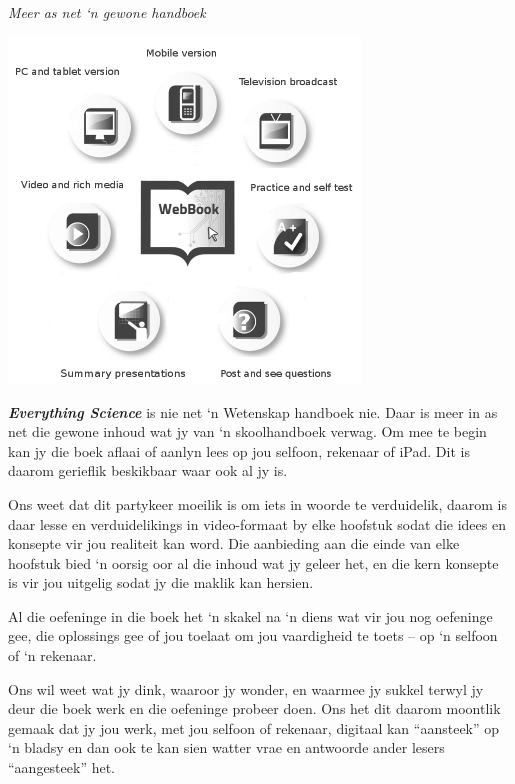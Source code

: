 
\newpage
\thispagestyle{empty}

{\normalfont\sffamily\fontsize{22}\normalfont\itshape Meer as net ‘n gewone handboek} \par

\begin{center}
\includegraphics[width=0.70\textwidth]{title_images/morethantextbook.png}
\end{center}

\par
{\Large
\textbf{\textit{Everything Science}} is nie net ‘n Wetenskap handboek nie. Daar is meer in as net die gewone inhoud wat jy van ‘n skoolhandboek verwag. Om mee te begin kan jy die boek aflaai of aanlyn lees op jou selfoon, rekenaar of iPad. Dit is daarom gerieflik beskikbaar waar ook al jy is.\par


Ons weet dat dit partykeer moeilik is om iets in woorde te verduidelik, daarom is daar lesse en verduidelikings in video-formaat by elke hoofstuk sodat die idees en konsepte vir jou realiteit kan word. Die aanbieding aan die einde van elke hoofstuk bied ‘n oorsig oor al die inhoud wat jy geleer het, en die kern konsepte is vir jou uitgelig sodat jy die maklik kan hersien.\par


Al die oefeninge in die boek het ‘n skakel na ‘n diens wat vir jou nog oefeninge gee, die oplossings gee of jou toelaat om jou vaardigheid te toets – op ‘n selfoon of ‘n rekenaar.\par


Ons wil weet wat jy dink, waaroor jy wonder, en waarmee jy sukkel terwyl jy deur die boek werk en die oefeninge probeer doen. Ons het dit daarom moontlik gemaak dat jy jou werk, met jou selfoon of rekenaar, digitaal kan “aansteek” op ‘n bladsy en dan ook te kan sien watter vrae en antwoorde ander lesers “aangesteek” het.\par


}




